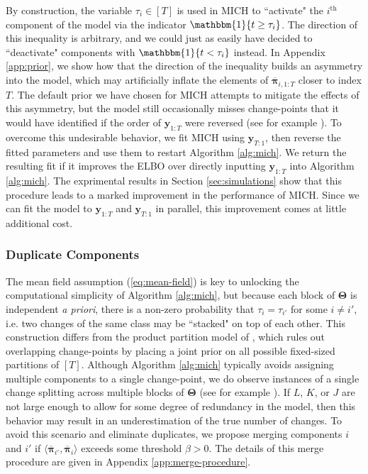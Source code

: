 By construction, the variable $\tau_i \in [T]$ is used in MICH to ``activate" the $i^{\text{th}}$ component of the model via the indicator $\mathbbm{1}\{t \geq \tau_i\}$. The direction of this inequality is arbitrary, and we could just as easily have decided to ``deactivate" components with  $\mathbbm{1}\{t < \tau_i\}$ instead. In Appendix \ref{app:prior}, we show how that the direction of the inequality builds an asymmetry into the model, which may artificially inflate the elements of $\overline{\boldsymbol{\pi}}_{i,1:T}$ closer to index $T$. The default prior we have chosen for MICH attempts to mitigate the effects of this asymmetry, but the model still occasionally misses change-points that it would have identified if the order of $\mathbf{y}_{1:T}$ were reversed (see for example ). To overcome this undesirable behavior, we fit MICH using $\mathbf{y}_{T:1}$, then reverse the fitted parameters and use them to restart Algorithm \ref{alg:mich}. We return the resulting fit if it improves the ELBO over directly inputting $\mathbf{y}_{1:T}$ into Algorithm \ref{alg:mich}. The exprimental results in Section \ref{sec:simulations} show that this procedure leads to a marked improvement in the performance of MICH. Since we can fit the model to $\mathbf{y}_{1:T}$ and $\mathbf{y}_{T:1}$ in parallel, this improvement comes at little additional cost. 

\subsubsection{Duplicate Components}
\label{sec:merge-procedure}

The mean field assumption (\ref{eq:mean-field}) is key to unlocking the computational simplicity of Algorithm \ref{alg:mich}, but because each block of $\boldsymbol{\Theta}$ is independent \textit{a priori}, there is a non-zero probability that $\tau_i = \tau_{i'}$ for some $i \neq i'$, i.e. two changes of the same class may be ``stacked" on top of each other. This construction differs from the product partition model of \cite{Barry93}, which rules out overlapping change-points by placing a joint prior on all possible fixed-sized partitions of $[T]$. Although Algorithm \ref{alg:mich} typically avoids assigning multiple components to a single change-point, we do observe instances of a single change splitting across multiple blocks of $\boldsymbol{\Theta}$ (see for example ). If $L$, $K$, or $J$ are not large enough to allow for some degree of redundancy in the model, then this behavior may result in an underestimation of the true number of changes. To avoid this scenario and eliminate duplicates, we propose merging components $i$ and $i'$ if $\langle\overline{\boldsymbol{\pi}}_{i'}, \overline{\boldsymbol{\pi}}_i \rangle$ exceeds some threshold $\beta > 0$. The details of this merge procedure are given in Appendix \ref{app:merge-procedure}.
